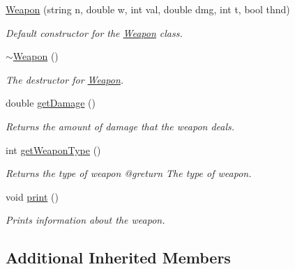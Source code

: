 \begin{DoxyCompactItemize}
\item 
\mbox{\hyperlink{class_weapon_aec5c83815d7bcf42cd5f4467001948c8}{Weapon}} (string n, double w, int val, double dmg, int t, bool thnd)
\begin{DoxyCompactList}\small\item\em Default constructor for the \mbox{\hyperlink{class_weapon}{Weapon}} class. \end{DoxyCompactList}\item 
\mbox{\label{class_weapon_a420e7ba3d2017e6de3e93eb579cfd3fa}} 
\mbox{\hyperlink{class_weapon_a420e7ba3d2017e6de3e93eb579cfd3fa}{$\sim$\+Weapon}} ()
\begin{DoxyCompactList}\small\item\em The destructor for \mbox{\hyperlink{class_weapon}{Weapon}}. \end{DoxyCompactList}\item 
double \mbox{\hyperlink{class_weapon_ab670a291cb5f5b470578524f3f65391b}{get\+Damage}} ()
\begin{DoxyCompactList}\small\item\em Returns the amount of damage that the weapon deals. \end{DoxyCompactList}\item 
\mbox{\label{class_weapon_ae801d0c42caf03432c4c97dfca48c88c}} 
int \mbox{\hyperlink{class_weapon_ae801d0c42caf03432c4c97dfca48c88c}{get\+Weapon\+Type}} ()
\begin{DoxyCompactList}\small\item\em Returns the type of weapon @greturn The type of weapon. \end{DoxyCompactList}\item 
\mbox{\label{class_weapon_a679eb1486e8e39e2f85fe4c9f6a433bb}} 
void \mbox{\hyperlink{class_weapon_a679eb1486e8e39e2f85fe4c9f6a433bb}{print}} ()
\begin{DoxyCompactList}\small\item\em Prints information about the weapon. \end{DoxyCompactList}\end{DoxyCompactItemize}
\subsection*{Additional Inherited Members}


